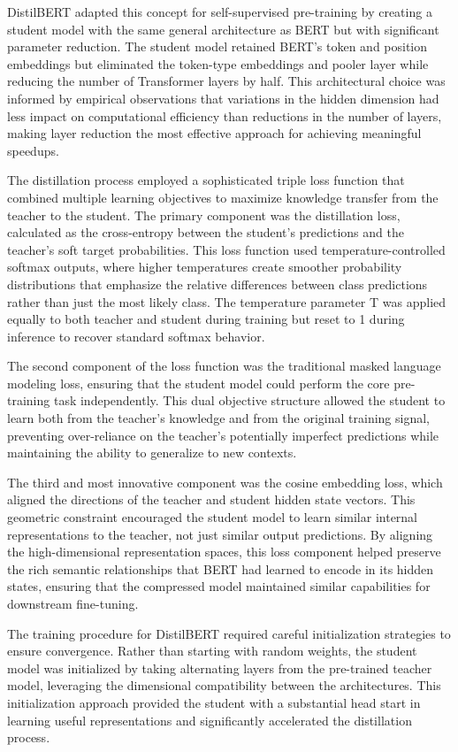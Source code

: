 \documentclass[
  titlepage]{article}
\begin{document}
DistilBERT adapted this concept for self-supervised pre-training by
creating a student model with the same general architecture as BERT but
with significant parameter reduction. The student model retained BERT's
token and position embeddings but eliminated the token-type embeddings
and pooler layer while reducing the number of Transformer layers by
half. This architectural choice was informed by empirical observations
that variations in the hidden dimension had less impact on computational
efficiency than reductions in the number of layers, making layer
reduction the most effective approach for achieving meaningful speedups.

The distillation process employed a sophisticated triple loss function
that combined multiple learning objectives to maximize knowledge
transfer from the teacher to the student. The primary component was the
distillation loss, calculated as the cross-entropy between the student's
predictions and the teacher's soft target probabilities. This loss
function used temperature-controlled softmax outputs, where higher
temperatures create smoother probability distributions that emphasize
the relative differences between class predictions rather than just the
most likely class. The temperature parameter T was applied equally to
both teacher and student during training but reset to 1 during inference
to recover standard softmax behavior.

The second component of the loss function was the traditional masked
language modeling loss, ensuring that the student model could perform
the core pre-training task independently. This dual objective structure
allowed the student to learn both from the teacher's knowledge and from
the original training signal, preventing over-reliance on the teacher's
potentially imperfect predictions while maintaining the ability to
generalize to new contexts.

The third and most innovative component was the cosine embedding loss,
which aligned the directions of the teacher and student hidden state
vectors. This geometric constraint encouraged the student model to learn
similar internal representations to the teacher, not just similar output
predictions. By aligning the high-dimensional representation spaces,
this loss component helped preserve the rich semantic relationships that
BERT had learned to encode in its hidden states, ensuring that the
compressed model maintained similar capabilities for downstream
fine-tuning.

The training procedure for DistilBERT required careful initialization
strategies to ensure convergence. Rather than starting with random
weights, the student model was initialized by taking alternating layers
from the pre-trained teacher model, leveraging the dimensional
compatibility between the architectures. This initialization approach
provided the student with a substantial head start in learning useful
representations and significantly accelerated the distillation process.
\end{document}

